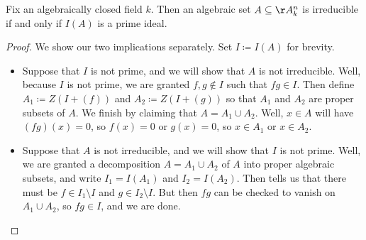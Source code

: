 \documentclass[../notes.tex]{subfiles}
\begin{document}
\begin{corollary}
	Fix an algebraically closed field $k$. Then an algebraic set $A\subseteq\AA^n_k$ is irreducible if and only if $I(A)$ is a prime ideal.
\end{corollary}
\begin{proof}
	We show our two implications separately. Set $I\coloneqq I(A)$ for brevity.
	\begin{itemize}
		\item Suppose that $I$ is not prime, and we will show that $A$ is not irreducible. Well, because $I$ is not prime, we are granted $f,g\notin I$ such that $fg\in I$. Then define $A_1\coloneqq Z(I+(f))$ and $A_2\coloneqq Z(I+(g))$ so that $A_1$ and $A_2$ are proper subsets of $A$. We finish by claiming that $A=A_1\cup A_2$. Well, $x\in A$ will have $(fg)(x)=0$, so $f(x)=0$ or $g(x)=0$, so $x\in A_1$ or $x\in A_2$.
		\item Suppose that $A$ is not irreducible, and we will show that $I$ is not prime. Well, we are granted a decomposition $A=A_1\cup A_2$ of $A$ into proper algebraic subsets, and write $I_1=I(A_1)$ and $I_2=I(A_2)$. Then  tells us that there must be $f\in I_1\setminus I$ and $g\in I_2\setminus I$. But then $fg$ can be checked to vanish on $A_1\cup A_2$, so $fg\in I$, and we are done.
		\qedhere
	\end{itemize}
\end{proof}
\end{document}
